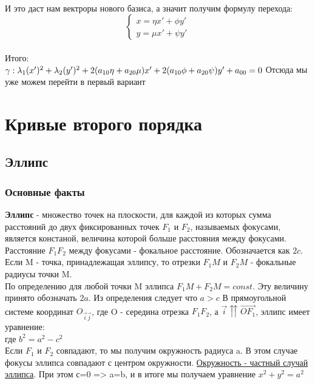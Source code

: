 \documentclass{book}
\begin{document}
\\
И это даст нам вектроры нового базиса, а значит получим формулу перехода:\\
\begin{equation}
    \begin{cases}
        x=\eta x'+\phi y'\\
        y=\mu x'+\psi y'
    \end{cases}
\end{equation}\\
Итого:\\
$\gamma: \lambda_1(x')^2+\lambda_2(y')^2+2(a_{10}\eta+a_{20}\mu)x'+2(a_{10}\phi+a_{20}\psi)y'+a_{00}=0\\$
Отсюда мы уже можем перейти в первый вариант\\
\chapter{Кривые второго порядка}
\section{Эллипс}
\subsection{Основные факты}
\textbf{Эллипс} - множество точек на плоскости, для каждой из которых сумма расстояний до двух фиксированных точек $F_1$ и $F_2$, называемых фокусами, является констаной, величина которой больше расстояния между фокусами.\\
Расстояние $F_1F_2$ между фокусами - фокальное расстояние. Обозначается как $2c$.\\
Если M - точка, принадлежащая эллипсу, то отрезки $F_1M$ и $F_2M$ - фокальные радиусы точки M.\\
По определению для любой точки M эллипса $F_1M+F_2M=\textit{const}$. Эту величину принято обозначать $2a$. Из определения следует что $a>c$
В прямоугольной системе координат $O_{\overrightarrow{i}\overrightarrow{j}}$,  где O - середина отрезка $F_1F_2$, а $\overrightarrow{i}\upuparrows\overrightarrow{OF_1}$, эллипс имеет уравнение:\\
где $b^2=a^2-c^2$\\
Если $F_1$ и $F_2$ совпадают, то мы получим окружность радиуса a. В этом случае фокусы эллипса совпадают с центром окружности.
\underline{Окружность - частный случай эллипса}. При этом с=0 => a=b, и в итоге мы получаем уравнение $x^2+y^2=a^2$\\
\end{document}
